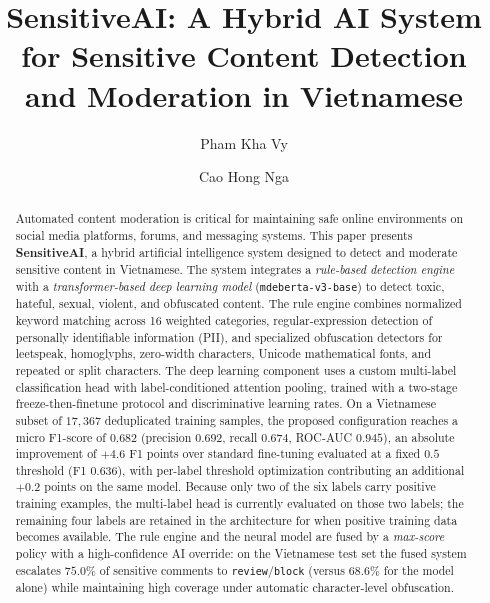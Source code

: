 \documentclass[runningheads]{llncs}
\begin{document}
%
\title{SensitiveAI: A Hybrid AI System for Sensitive Content Detection and Moderation in Vietnamese}
%
\author{Pham Kha Vy \and Cao Hong Nga}
%
%

%
\maketitle
%
\begin{abstract}
Automated content moderation is critical for maintaining safe online environments on social media platforms, forums, and messaging systems.
This paper presents \textbf{SensitiveAI}, a hybrid artificial intelligence system designed to detect and moderate sensitive content in Vietnamese.
The system integrates a \textit{rule-based detection engine} with a \textit{transformer-based deep learning model} (\texttt{mdeberta-v3-base}) to detect toxic, hateful, sexual, violent, and obfuscated content.
The rule engine combines normalized keyword matching across 16 weighted categories, regular-expression detection of personally identifiable information (PII), and specialized obfuscation detectors for leetspeak, homoglyphs, zero-width characters, Unicode mathematical fonts, and repeated or split characters.
The deep learning component uses a custom multi-label classification head with label-conditioned attention pooling, trained with a two-stage freeze-then-finetune protocol and discriminative learning rates.
On a Vietnamese subset of $17{,}367$ deduplicated training samples, the proposed configuration reaches a micro F1-score of $0.682$ (precision $0.692$, recall $0.674$, ROC-AUC $0.945$), an absolute improvement of $+4.6$ F1 points over standard fine-tuning evaluated at a fixed $0.5$ threshold (F1 $0.636$), with per-label threshold optimization contributing an additional $+0.2$ points on the same model.
Because only two of the six labels carry positive training examples, the multi-label head is currently evaluated on those two labels; the remaining four labels are retained in the architecture for when positive training data becomes available.
The rule engine and the neural model are fused by a \textit{max-score} policy with a high-confidence AI override: on the Vietnamese test set the fused system escalates $75.0\%$ of sensitive comments to \texttt{review}/\texttt{block} (versus $68.6\%$ for the model alone) while maintaining high coverage under automatic character-level obfuscation.

\end{abstract}
%
\end{document}
